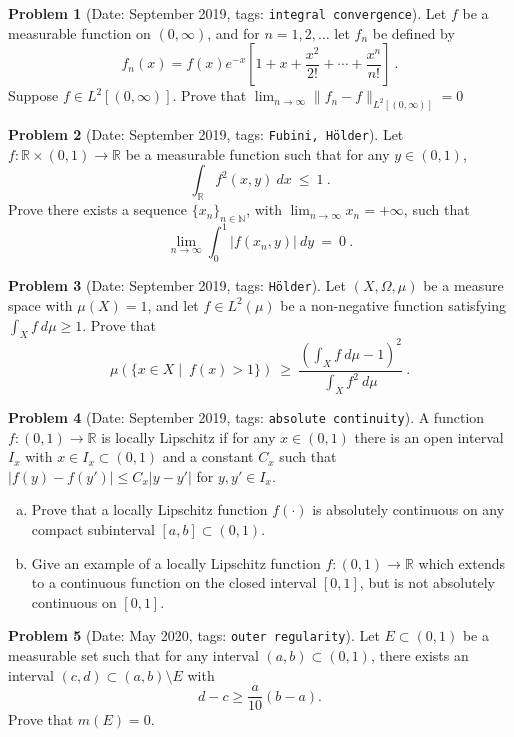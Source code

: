 \documentclass[11pt, notitlepage]{article}
\theoremstyle{definition}
\theoremstyle{definition}
\theoremstyle{definition}
\newtheorem{probstate}{Problem}
\theoremstyle{remark}
\newenvironment{problem}[2]{
    \begin{probstate}[Date: #1, tags: \texttt{#2}]
}
{
  \end{probstate}
}
\begin{document}
\begin{problem}{September 2019}{integral convergence}
  Let  $f$ be a measurable function on $(0,\infty)$, and for $n=1,2,\ldots$ let
$f_n$ be defined by
$$
f_n(x)=f(x)e^{-x}\left[1+x+\frac{x^2}{2!}+\cdots+\frac{x^n}{n!}\right] \ .
$$
Suppose $f \in L^2[(0,\infty)]$. Prove that $\lim_{n\to \infty}\|f_n-f\|_{L^2[(0,\infty)]}=0$
\end{problem}

\begin{problem}{September 2019}{Fubini, Hölder}
    Let $f:\mathbb{R}\times (0,1)\to\mathbb{R}$ be a measurable function such that for any $y\in(0,1)$,
$$\int_{\mathbb{R}} f^2(x,y) \ dx \ \le \ 1\  .
$$
Prove there exists a sequence $\{x_n\}_{n\in\mathbb{N}}$, with $\lim_{n\to\infty}x_n=+\infty$, such that
$$\lim_{n\to\infty} \int_0^1 |f(x_n,y)| \ dy \ = \ 0 \  .
$$
\end{problem}

\begin{problem}{September 2019}{Hölder}
  Let $(X,\Omega,\mu)$ be a measure space with $\mu(X)=1$, and let $f\in L^2(\mu)$ be a non-negative function satisfying $\int_X f \ d\mu\ge 1$. Prove that
$$
\mu\left(\{x\in X  \mid \ f(x)>1\}\right) \ \ge \  \frac{\left(\int_{X} f \ d\mu-1\right)^2}{\int_X f^2 \ d\mu} \ .
$$
\end{problem}

\begin{problem}{September 2019}{absolute continuity}
   A function $f:(0,1)\to\mathbb{R}$ is locally Lipschitz if for   any $x\in(0,1)$ there is an open interval $I_x$ with $x\in I_x\subset (0,1)$ and a constant $C_x$ such that $|f(y)-f(y')|\le C_x|y-y'|$ for $y,y'\in I_x$.

\begin{enumerate}[(a)]
\item Prove that a locally Lipschitz function $f(\cdot)$ is absolutely continuous on any compact subinterval
$[a,b]\subset (0,1)$.

\item  Give an example of a locally Lipschitz function $f:(0,1)\to\mathbb{R}$ which extends to a continuous function on the closed interval $[0,1]$, but is not absolutely continuous on $[0,1]$.
\end{enumerate}
\end{problem}

\begin{problem}{May 2020}{outer regularity}
  Let $E \subset (0,1)$ be a measurable set such that for any interval $(a,b) \subset (0,1)$, there exists an interval $(c,d) \subset (a,b) \setminus E$ with
 \[
  d-c \ge \frac{a}{10} (b-a).
 \]
 Prove that $m(E)=0$.

\end{problem}
\end{document}
